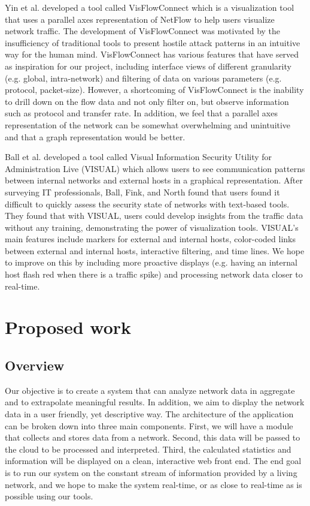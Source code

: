 \documentclass{sig-alternate}
\begin{document}
Yin et al.\cite{Yin04} developed a tool called VisFlowConnect which is a
visualization tool that uses a parallel axes representation of NetFlow to help
users visualize network traffic. The development of VisFlowConnect was motivated
by the insufficiency of traditional tools to present hostile attack patterns in
an intuitive way for the human mind. VisFlowConnect has various features that
have served as inspiration for our project, including interface views of
different granularity (e.g. global, intra-network) and filtering of data on
various parameters (e.g. protocol, packet-size). However, a shortcoming of
VisFlowConnect is the inability to drill down on the flow data and not only
filter on, but observe information such as protocol and transfer rate. In
addition, we feel that a parallel axes representation of the network can be
somewhat overwhelming and unintuitive and that a graph representation would be
better.

Ball et al.\cite{Ball04} developed a tool called Visual Information Security
Utility for Administration Live (VISUAL) which allows users to see communication
patterns between internal networks and external hosts in a graphical
representation. After surveying IT professionals, Ball, Fink, and North found
that users found it difficult to quickly assess the security state of networks
with text-based tools. They found that with VISUAL, users could develop insights
from the traffic data without any training, demonstrating the power of
visualization tools. VISUAL's main features include markers for external and
internal hosts, color-coded links between external and internal hosts,
interactive filtering, and time lines. We hope to improve on this by including
more proactive displays (e.g. having an internal host flash red when there is a
traffic spike) and processing network data closer to real-time.

\section{Proposed work}

\subsection{Overview}

Our objective is to create a system that can analyze network data in aggregate
and to extrapolate meaningful results. In addition, we aim to display the
network data in a user friendly, yet descriptive way. The architecture of the
application can be broken down into three main components. First, we will have a
module that collects and stores data from a network. Second, this data will be
passed to the cloud to be processed and interpreted. Third, the calculated
statistics and information will be displayed on a clean, interactive web front
end. The end goal is to run our system on the constant stream of information
provided by a living network, and we hope to make the system real-time, or as
close to real-time as is possible using our tools.
\end{document}
